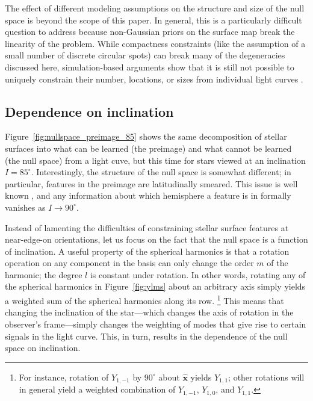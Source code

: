 \documentclass[modern]{aastex62}
\begin{document}
The effect of different modeling assumptions on the structure and size of the null
space is beyond the scope of this paper. In general, this is a particularly
difficult question to address because non-Gaussian priors on the
surface map break the linearity of the problem. While compactness constraints
(like the assumption of a small number of discrete circular spots) can
break many of the degeneracies discussed here, simulation-based
arguments show that it is still not possible to uniquely constrain
their number, locations, or sizes from individual light curves
\citep{Basri2020}.


\subsection{Dependence on inclination}
\label{sec:inclination}

Figure~\ref{fig:nullspace_preimage_85} shows the same decomposition
of stellar surfaces into what can be learned (the preimage) and what
cannot be learned (the null space) from a light cuve, but this time
for stars viewed at an inclination $I = 85^\circ$. Interestingly,
the structure of the null space is somewhat different; in particular,
features in the preimage are latitudinally smeared. This
issue is well known \citep[e.g.,][]{Cowan2009,Basri2020}, and any
information about which hemisphere a feature is in formally vanishes
as $I \rightarrow 90^\circ$.

Instead of lamenting the difficulties of constraining stellar surface features
at near-edge-on orientations, let us focus on the fact that the
null space is a function of inclination.
%
A useful property of
the spherical harmonics is that a rotation operation on any
component in the basis can only change the order $m$ of the
harmonic; the degree $l$ is constant under rotation. In other
words, rotating any of the spherical harmonics in Figure~\ref{fig:ylms}
about an arbitrary axis simply yields a weighted sum of the spherical
harmonics along its row.%
\footnote{For instance, rotation of $Y_{1,-1}$ by $90^\circ$ about
    $\hat{\mathbf{x}}$ yields $Y_{1,1}$; other rotations will in general
    yield a weighted combination of $Y_{1,-1}$, $Y_{1,0}$, and $Y_{1,1}$.}
This means that changing the inclination of the star---which changes
the axis of rotation in the observer's frame---simply changes the weighting
of modes that give rise to certain signals in the light curve.
This, in turn, results in the dependence of the null space on inclination.
\end{document}
